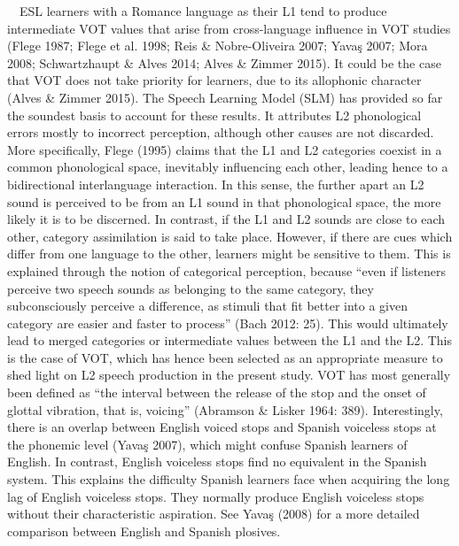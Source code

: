 \documentclass[11pt]{article}
\newenvironment{styleNormali}{\setlength\leftskip{0cm}\setlength\rightskip{0cm plus 1fil}\setlength\parindent{0cm}\setlength\parfillskip{0pt plus 1fil}\setlength\parskip{0cm plus 1pt}\writerlistparindent\writerlistleftskip\leavevmode\normalfont\normalsize\writerlistlabel\ignorespaces}{\unskip\vspace{0cm plus 1pt}\par}
\newcommand\writerlistleftskip{}
\newcommand\writerlistparindent{}
\newcommand\writerlistlabel{}
\begin{document}
\begin{styleNormali}
\ \ ESL learners with a Romance language as their L1 tend to produce intermediate VOT values that arise from cross-language influence in VOT studies (Flege 1987; Flege et al. 1998; Reis \& Nobre-Oliveira 2007; Yavaş 2007; Mora 2008; Schwartzhaupt \& Alves 2014; Alves \& Zimmer 2015). It could be the case that VOT does not take priority for learners, due to its allophonic character (Alves \& Zimmer 2015). The Speech Learning Model (SLM) has provided so far the soundest basis to account for these results. It attributes L2 phonological errors mostly to incorrect perception, although other causes are not discarded. More specifically, Flege (1995) claims that the L1 and L2 categories coexist in a common phonological space, inevitably influencing each other, leading hence to a bidirectional interlanguage interaction. In this sense, the further apart an L2 sound is perceived to be from an L1 sound in that phonological space, the more likely it is to be discerned. In contrast, if the L1 and L2 sounds are close to each other, category assimilation is said to take place. However, if there are cues which differ from one language to the other, learners might be sensitive to them. This is explained through the notion of categorical perception, because “even if listeners perceive two speech sounds as belonging to the same category, they subconsciously perceive a difference, as stimuli that fit better into a given category are easier and faster to process” (Bach 2012: 25). This would ultimately lead to merged categories or intermediate values between the L1 and the L2. This is the case of VOT, which has hence been selected as an appropriate measure to shed light on L2 speech production in the present study. VOT has most generally been defined as “the interval between the release of the stop and the onset of glottal vibration, that is, voicing” (Abramson \& Lisker 1964: 389). Interestingly, there is an overlap between English voiced stops and Spanish voiceless stops at the phonemic level (Yavaş 2007), which might confuse Spanish learners of English. In contrast, English voiceless stops find no equivalent in the Spanish system. This explains the difficulty Spanish learners face when acquiring the long lag of English voiceless stops. They normally produce English voiceless stops without their characteristic aspiration. See Yavaş (2008) for a more detailed comparison between English and Spanish plosives.
\end{styleNormali}
\end{document}
